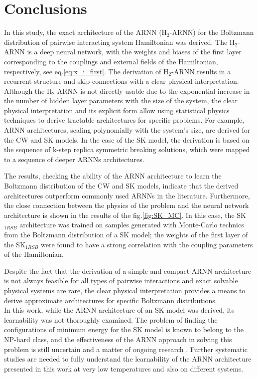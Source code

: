 \documentclass[aps,physrev,10pt,floatfix,reprint]{revtex4-2}
\begin{document}
\section{Conclusions}
In this study, the exact architecture of the ARNN (H$_2$-ARNN) for the Boltzmann distribution of pairwise interacting system Hamiltonian was derived. The H$_2$-ARNN is a deep neural network, with the weights and biases of the first layer corresponding to the couplings and external fields of the Hamiltonian, respectively, see eq.\ref{eq:x_i_first}. The derivation of H$_2$-ARNN results in a recurrent structure and skip-connections with a clear physical interpretation. Although the H$_2$-ARNN is not directly usable due to the exponential increase in the number of hidden layer parameters with the size of the system, the clear physical interpretation and its explicit form allow using statistical physics techniques to derive tractable architectures for specific problems. For example, ARNN architectures, scaling polynomially with the system's size, are derived for the CW and SK models. In the case of the SK model, the derivation is based on the sequence of k-step replica symmetric breaking solutions, which were mapped to a sequence of deeper ARNNs architectures.

The results, checking the ability of the ARNN architecture to learn the Boltzmann distribution of the CW and SK models, indicate that the derived architectures outperform commonly used ARNNs in the literature. Furthermore, the close connection between the physics of the problem and the neural network architecture is shown in the results of the fig.\ref{fig:SK_MC}. In this case, the  SK$_{1RSB}$ architecture was trained on samples generated with Monte-Carlo technics from the Boltzmann distribution of a SK model; the weights of the first layer of the SK$_{1RSB}$ were found to have a strong correlation with the coupling parameters of the Hamiltonian.

Despite the fact that the derivation of a simple and compact ARNN architecture is not always feasible for all types of pairwise interactions and exact solvable physical systems are rare, the clear physical interpretation provides a means to derive approximate architectures for specific Boltzmann distributions. \\
In this work, while the ARNN architecture of an SK model was derived, its learnability was not thoroughly examined. The problem of finding the configurations of minimum energy for the SK model is known to belong to the NP-hard class, and the effectiveness of the ARNN approach in solving this problem is still uncertain and a matter of ongoing research \cite{https://doi.org/10.48550/arxiv.2210.11145, 10.1038/s42256-021-00401-3, condmat7020038}. Further systematic studies are needed to fully understand the learnability of the ARNN architecture presented in this work at very low temperatures and also on different systems.\\
\end{document}
